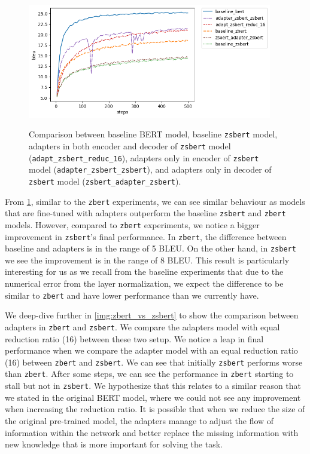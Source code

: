 \begin{figure}[h]
    {\includegraphics[width=0.95\textwidth]{img/zsbert_pos.png}}
    \centering
    \caption{Comparison between baseline BERT model, baseline \texttt{zsbert} model, adapters in both encoder and decoder of \texttt{zsbert} model (\texttt{adapt\_zsbert\_reduc\_16}), adapters only in encoder of \texttt{zsbert} model (\texttt{adapter\_zsbert\_zsbert}), and adapters only in decoder of \texttt{zsbert} model (\texttt{zsbert\_adapter\_zsbert}).}
    \label{img:zsbert_pos}
\end{figure}

From \cref{img:zsbert_pos}, similar to the \texttt{zbert} experiments, we can see similar behaviour as models that are fine-tuned with adapters outperform the baseline \texttt{zsbert} and \texttt{zbert} models. However, compared to \texttt{zbert} experiments, we notice a bigger improvement in \texttt{zsbert}'s final performance. In \texttt{zbert}, the difference between baseline and adapters is in the range of 5 BLEU. On the other hand, in \texttt{zsbert} we see the improvement is in the range of 8 BLEU. This result is particularly interesting for us as we recall from the baseline experiments that due to the numerical error from the layer normalization, we expect the difference to be similar to \texttt{zbert} and have lower performance than we currently have.

We deep-dive further in \cref{img:zbert_vs_zsbert} to show the comparison between adapters in \texttt{zbert} and \texttt{zsbert}. We compare the adapters model with equal reduction ratio (16) between these two setup. We notice a leap in final performance when we compare the adapter model with an equal reduction ratio (16) between \texttt{zbert} and \texttt{zsbert}. We can see that initially \texttt{zsbert} performs worse than \texttt{zbert}. After some steps, we can see the performance in \texttt{zbert} starting to stall but not in \texttt{zsbert}. We hypothesize that this relates to a similar reason that we stated in the original BERT model, where we could not see any improvement when increasing the reduction ratio. It is possible that when we reduce the size of the original pre-trained model, the adapters manage to adjust the flow of information within the network and better replace the missing information with new knowledge that is more important for solving the task.

